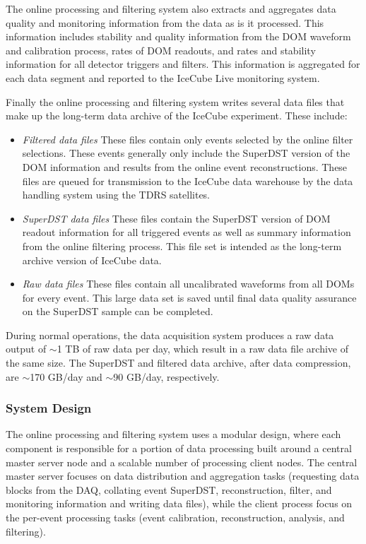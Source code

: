 The online processing and filtering system also extracts and aggregates data quality and monitoring information
from the data as is it processed.  This information includes stability and quality information from the
DOM waveform and calibration process, rates of DOM readouts, and rates and stability
information for all detector triggers and filters.  This information is aggregated for each data segment and
reported to the IceCube Live monitoring system.

Finally the online processing and filtering system writes several data files that make up the long-term data archive of the IceCube
experiment.  These include:
\begin{itemize}
\item \emph {Filtered data files} These files contain only events selected by the online filter selections.  These events
generally only include the SuperDST version of the DOM information and results from the online event reconstructions.  These
files are queued for transmission to the IceCube data warehouse by the data handling system using the TDRS satellites.
\item \emph {SuperDST data files} These files contain the SuperDST version of DOM readout information for all triggered events as well as summary
information from the online filtering process.  This file set is intended as the long-term archive version of IceCube data.
\item \emph {Raw data files}  These files contain all uncalibrated waveforms from all DOMs for every event.  This large data
set is saved until final data quality assurance on the SuperDST sample can be completed.
\end{itemize}

During normal operations, the data acquisition system produces a raw data output of $\sim$1 TB of raw data per day, which result in
a raw data file archive of the same size.  The SuperDST  and filtered data archive, after data compression, are $\sim$170 GB/day and $\sim$90 GB/day,
respectively.
\subsubsection{System Design}

The online processing and filtering system uses a modular design, where each component
is responsible for a portion of data processing built around a central master server node and a
scalable number of processing client nodes.  The central master server focuses on
data distribution and aggregation tasks (requesting data blocks from the DAQ, collating event SuperDST, reconstruction, filter,
and monitoring information and writing data files), while the client process focus on the per-event
processing tasks (event calibration, reconstruction, analysis, and filtering).  

